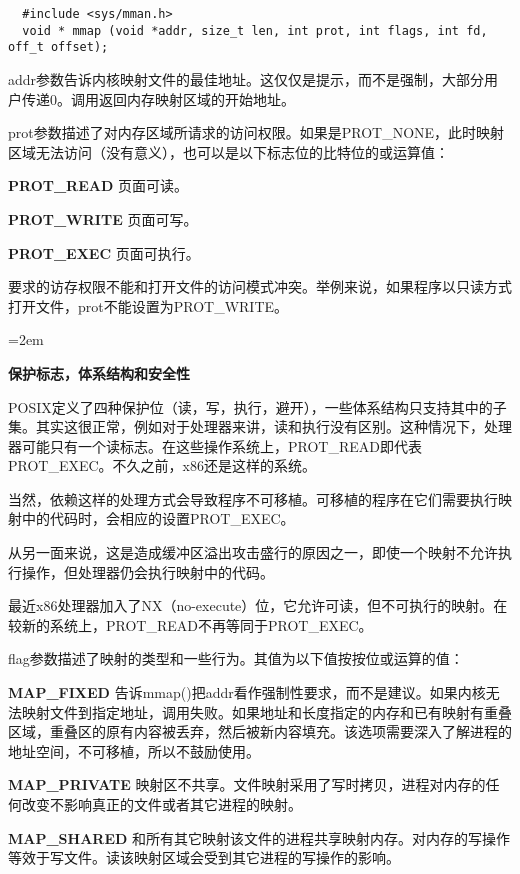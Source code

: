 \begin{lstlisting}
  #include <sys/mman.h>
  void * mmap (void *addr, size_t len, int prot, int flags, int fd, off_t offset);
\end{lstlisting}

addr参数告诉内核映射文件的最佳地址。这仅仅是提示，而不是强制，大部分用户传递0。调用返回内存映射区域的开始地址。

prot参数描述了对内存区域所请求的访问权限。如果是PROT\_NONE，此时映射区域无法访问（没有意义），也可以是以下标志位的比特位的或运算值：

\begin{eqlist*}
\item[\textbf{PROT\_READ}] 页面可读。
\item[\textbf{PROT\_WRITE}] 页面可写。
\item[\textbf{PROT\_EXEC}] 页面可执行。
\end{eqlist*}

要求的访存权限不能和打开文件的访问模式冲突。举例来说，如果程序以只读方式打开文件，prot不能设置为PROT\_WRITE。

\begin{center}
\begin{boxedminipage}{\textwidth}
\parindent=2em
\begin{center}\textbf{保护标志，体系结构和安全性}\end{center}

POSIX定义了四种保护位（读，写，执行，避开），一些体系结构只支持其中的子集。其实这很正常，例如对于处理器来讲，读和执行没有区别。这种情况下，处理器可能只有一个读标志。在这些操作系统上，PROT\_READ即代表PROT\_EXEC。不久之前，x86还是这样的系统。

当然，依赖这样的处理方式会导致程序不可移植。可移植的程序在它们需要执行映射中的代码时，会相应的设置PROT\_EXEC。

从另一面来说，这是造成缓冲区溢出攻击盛行的原因之一，即使一个映射不允许执行操作，但处理器仍会执行映射中的代码。

最近x86处理器加入了NX（no-execute）位，它允许可读，但不可执行的映射。在较新的系统上，PROT\_READ不再等同于PROT\_EXEC。
\end{boxedminipage}
\end{center}

flag参数描述了映射的类型和一些行为。其值为以下值按按位或运算的值：

\begin{eqlist*}
\item[\textbf{MAP\_FIXED}] 告诉mmap()把addr看作强制性要求，而不是建议。如果内核无法映射文件到指定地址，调用失败。如果地址和长度指定的内存和已有映射有重叠区域，重叠区的原有内容被丢弃，然后被新内容填充。该选项需要深入了解进程的地址空间，不可移植，所以不鼓励使用。
\item[\textbf{MAP\_PRIVATE}] 映射区不共享。文件映射采用了写时拷贝，进程对内存的任何改变不影响真正的文件或者其它进程的映射。
\item[\textbf{MAP\_SHARED}] 和所有其它映射该文件的进程共享映射内存。对内存的写操作等效于写文件。读该映射区域会受到其它进程的写操作的影响。
\end{eqlist*}


